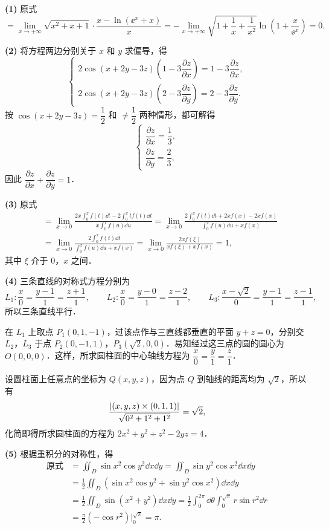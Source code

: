 \begin{solution}
\textbf{(1)} 原式
\[
=\lim_{x\to+\infty}\sqrt{x^{2}+x+1}\cdot\frac{x-\ln(\ee^{x}+x)}{x}
=-\lim_{x\to+\infty}\sqrt{1+\frac{1}{x}+\frac{1}{x^{2}}}\ln\left(1+\frac{x}{\ee^{x}}\right)=0.
\]

\textbf{(2)} 将方程两边分别关于 $x$ 和 $y$ 求偏导，得
\[
\begin{cases}
2\cos(x+2y-3z)\left(1-3\dfrac{\partial z}{\partial x}\right)=1-3\dfrac{\partial z}{\partial x},\\[2ex]
2\cos(x+2y-3z)\left(2-3\dfrac{\partial z}{\partial y}\right)=2-3\dfrac{\partial z}{\partial y}.
\end{cases}
\]
按 $\cos(x+2y-3z)=\dfrac{1}{2}$ 和 $\neq\dfrac{1}{2}$ 两种情形，都可解得
\[
\begin{cases}
\dfrac{\partial z}{\partial x}=\dfrac{1}{3},\\[2ex]
\dfrac{\partial z}{\partial y}=\dfrac{2}{3},
\end{cases}
\]
因此 $\dfrac{\partial z}{\partial x}+\dfrac{\partial z}{\partial y}=1$．

\textbf{(3)} 原式
\begin{align*}
&=\lim_{x\to0}\frac{2x\int_{0}^{x}f(t)\dd t-2\int_{0}^{x}tf(t)\dd t}{x\int_{0}^{x}f(u)\dd u}
=\lim_{x\to0}\frac{2\int_{0}^{x}f(t)\dd t+2xf(x)-2xf(x)}{\int_{0}^{x}f(u)\dd u+xf(x)}\\
&=\lim_{x\to0}\frac{2\int_{0}^{x}f(t)\dd t}{\int_{0}^{x}f(u)\dd u+xf(x)}
=\lim_{x\to0}\frac{2xf(\xi)}{xf(\xi)+xf(x)}=1,
\end{align*}
其中 $\xi$ 介于 $0$，$x$ 之间．

\textbf{(4)} 三条直线的对称式方程分别为
\[
L_{1}:\frac{x}{0}=\frac{y-1}{1}=\frac{z+1}{1},\qquad
L_{2}:\frac{x}{0}=\frac{y-0}{1}=\frac{z-2}{1},\qquad
L_{3}:\frac{x-\sqrt{2}}{0}=\frac{y-1}{1}=\frac{z-1}{1},
\]
所以三条直线平行．

在 $L_{1}$ 上取点 $P_{1}(0,1,-1)$，过该点作与三直线都垂直的平面 $y+z=0$，分别交 $L_{2}$，$L_{3}$ 于点 $P_{2}(0,-1,1)$，$P_{3}(\sqrt{2},0,0)$．易知经过这三点的圆的圆心为 $O(0,0,0)$．这样，所求圆柱面的中心轴线方程为 $\dfrac{x}{0}=\dfrac{y}{1}=\dfrac{z}{1}$．

设圆柱面上任意点的坐标为 $Q(x,y,z)$，因为点 $Q$ 到轴线的距离均为 $\sqrt{2}$，所以有
\[
\frac{\left|(x,y,z)\times(0,1,1)\right|}{\sqrt{0^{2}+1^{2}+1^{2}}}=\sqrt{2},
\]
化简即得所求圆柱面的方程为 $2x^{2}+y^{2}+z^{2}-2yz=4$．

\textbf{(5)} 根据重积分的对称性，得
\begin{align*}
\text{原式}&=\iint_{D}\sin x^{2}\cos y^{2}\dd x\dd y=\iint_{D}\sin y^{2}\cos x^{2}\dd x\dd y\\
&=\frac{1}{2}\iint_{D}\left(\sin x^{2}\cos y^{2}+\sin y^{2}\cos x^{2}\right)\dd x\dd y\\
&=\frac{1}{2}\iint_{D}\sin(x^{2}+y^{2})\dd x\dd y=\frac{1}{2}\int_{0}^{2\pi}\dd\theta\int_{0}^{\sqrt{\pi}}r\sin r^{2}\dd r\\
&=\frac{\pi}{2}\left(-\cos r^{2}\right)\Big|_{0}^{\sqrt{\pi}}=\pi.
\end{align*}
\end{solution}

